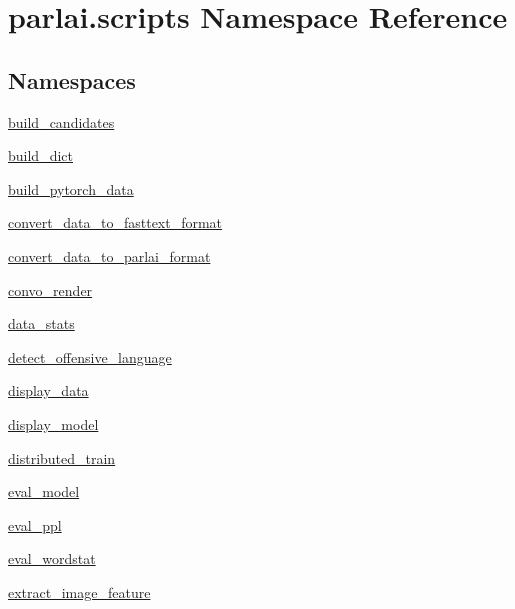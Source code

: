\hypertarget{namespaceparlai_1_1scripts}{}\section{parlai.\+scripts Namespace Reference}
\label{namespaceparlai_1_1scripts}
\subsection*{Namespaces}
\begin{DoxyCompactItemize}
\item 
 \hyperlink{namespaceparlai_1_1scripts_1_1build__candidates}{build\+\_\+candidates}
\item 
 \hyperlink{namespaceparlai_1_1scripts_1_1build__dict}{build\+\_\+dict}
\item 
 \hyperlink{namespaceparlai_1_1scripts_1_1build__pytorch__data}{build\+\_\+pytorch\+\_\+data}
\item 
 \hyperlink{namespaceparlai_1_1scripts_1_1convert__data__to__fasttext__format}{convert\+\_\+data\+\_\+to\+\_\+fasttext\+\_\+format}
\item 
 \hyperlink{namespaceparlai_1_1scripts_1_1convert__data__to__parlai__format}{convert\+\_\+data\+\_\+to\+\_\+parlai\+\_\+format}
\item 
 \hyperlink{namespaceparlai_1_1scripts_1_1convo__render}{convo\+\_\+render}
\item 
 \hyperlink{namespaceparlai_1_1scripts_1_1data__stats}{data\+\_\+stats}
\item 
 \hyperlink{namespaceparlai_1_1scripts_1_1detect__offensive__language}{detect\+\_\+offensive\+\_\+language}
\item 
 \hyperlink{namespaceparlai_1_1scripts_1_1display__data}{display\+\_\+data}
\item 
 \hyperlink{namespaceparlai_1_1scripts_1_1display__model}{display\+\_\+model}
\item 
 \hyperlink{namespaceparlai_1_1scripts_1_1distributed__train}{distributed\+\_\+train}
\item 
 \hyperlink{namespaceparlai_1_1scripts_1_1eval__model}{eval\+\_\+model}
\item 
 \hyperlink{namespaceparlai_1_1scripts_1_1eval__ppl}{eval\+\_\+ppl}
\item 
 \hyperlink{namespaceparlai_1_1scripts_1_1eval__wordstat}{eval\+\_\+wordstat}
\item 
 \hyperlink{namespaceparlai_1_1scripts_1_1extract__image__feature}{extract\+\_\+image\+\_\+feature}

\end{DoxyCompactItemize}
